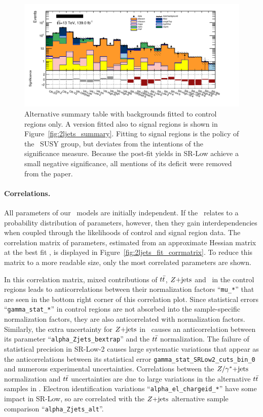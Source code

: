 \begin{figure}[tp]
\centering
\includegraphics[width=\textwidth]{figures/2ljets_summary_no_sr_log.png}
\caption[
Alternative summary table with backgrounds fitted to control regions only
]{%
Alternative summary table with backgrounds fitted to control regions only.
A version fitted also to signal regions is shown in
Figure~\ref{fig:2ljets_summary}.
Fitting to signal regions is the policy of the \atlas\ SUSY group, but deviates
from the intentions of the significance measure.
Because the post-fit yields in SR-Low achieve a small negative significance,
all mentions of its deficit were removed from the paper.
}
\label{fig:2ljets_summary_no_sr}
\end{figure}

\paragraph{Correlations.}
All parameters of our \histfactory\ models are initially independent.
If the \heplikelihood\ relates to a probability distribution of parameters,
however, then they gain interdependencies when coupled through the likelihoods
of control and signal region data.
The correlation matrix of parameters, estimated from an approximate Hessian
matrix at the best fit \heplikelihood, is displayed in
Figure~\ref{fig:2ljets_fit_corrmatrix}.
To reduce this matrix to a more readable size, only the most correlated
parameters are shown.

In this correlation matrix, mixed contributions of $t\bar t$, $Z\mathrm{+jets}$ and
\diboson\ in the control regions leads to anticorrelations between their
normalization factors
``\texttt{mu\_*}'' that are seen in the bottom right corner of this correlation
plot.
Since statistical errors ``\texttt{gamma\_stat\_*}'' in control regions are not
absorbed into the sample-specific normalization factors, they are also
anticorrelated with normalization factors.
Similarly, the extra uncertainty for $Z\mathrm{+jets}$ in \crtt\ causes an
anticorrelation between its parameter ``\texttt{alpha\_Zjets\_bextrap}''
and the $t\bar t$ normalization.
The failure of statistical precision in SR-Low-2 causes large systematic
variations that appear as the anticorrelations between its statistical error
\texttt{gamma\_stat\_SRLow2\_cuts\_bin\_0} and numerous experimental
uncertainties.
Correlations between the $Z/\gamma^*\mathrm{+jets}$ normalization and $t\bar t$ uncertainties
are due to large variations in the alternative $t\bar t$ samples in \crdy.
Electron identification variations ``\texttt{alpha\_el\_chargeid\_*}'' have
some impact in SR-Low,  so are correlated with the $Z\mathrm{+jets}$ alternative sample
comparison ``\texttt{alpha\_Zjets\_alt}''.

